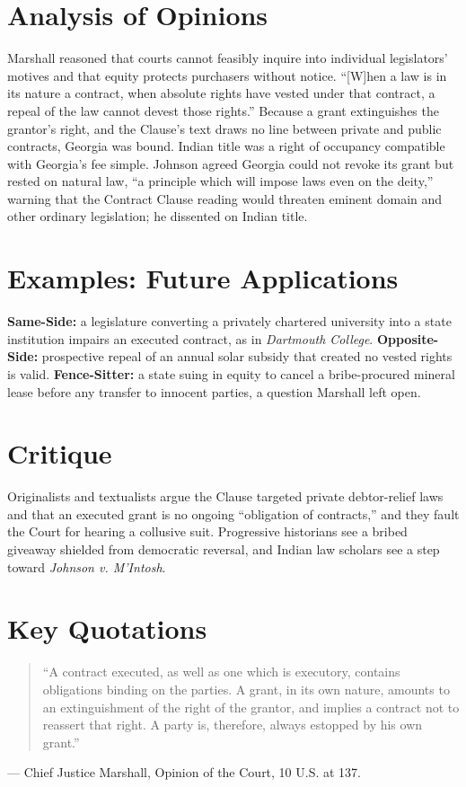 \documentclass[12pt]{article}
\begin{document}
\section{Analysis of Opinions}
Marshall reasoned that courts cannot feasibly inquire into individual legislators' motives and that equity protects purchasers without notice. ``[W]hen a law is in its nature a contract, when absolute rights have vested under that contract, a repeal of the law cannot devest those rights.'' Because a grant extinguishes the grantor's right, and the Clause's text draws no line between private and public contracts, Georgia was bound. Indian title was a right of occupancy compatible with Georgia's fee simple. Johnson agreed Georgia could not revoke its grant but rested on natural law, ``a principle which will impose laws even on the deity,'' warning that the Contract Clause reading would threaten eminent domain and other ordinary legislation; he dissented on Indian title.

\section{Examples: Future Applications}
\textbf{Same-Side:} a legislature converting a privately chartered university into a state institution impairs an executed contract, as in \textit{Dartmouth College}. \textbf{Opposite-Side:} prospective repeal of an annual solar subsidy that created no vested rights is valid. \textbf{Fence-Sitter:} a state suing in equity to cancel a bribe-procured mineral lease before any transfer to innocent parties, a question Marshall left open.

\section{Critique}
Originalists and textualists argue the Clause targeted private debtor-relief laws and that an executed grant is no ongoing ``obligation of contracts,'' and they fault the Court for hearing a collusive suit. Progressive historians see a bribed giveaway shielded from democratic reversal, and Indian law scholars see a step toward \textit{Johnson v. M'Intosh}.

\section{Key Quotations}
\begin{quote}
``A contract executed, as well as one which is executory, contains obligations binding on the parties. A grant, in its own nature, amounts to an extinguishment of the right of the grantor, and implies a contract not to reassert that right. A party is, therefore, always estopped by his own grant.''
\end{quote}
\noindent --- Chief Justice Marshall, Opinion of the Court, 10 U.S. at 137.
\end{document}
